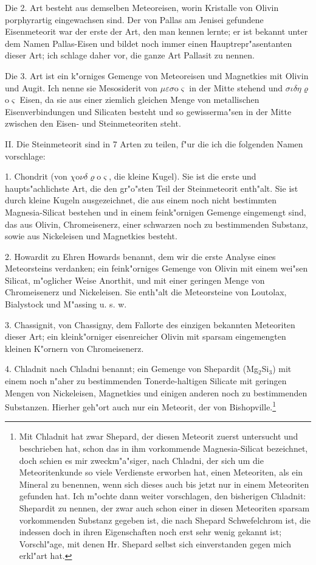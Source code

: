 \documentclass[a4paper, 11pt, oneside, german]{article}
\begin{document}
Die 2. Art besteht aus demselben Meteoreisen, worin Kristalle von Olivin porphyrartig eingewachsen sind. Der von Pallas am Jenisei gefundene Eisenmeteorit war der erste der Art, den man kennen lernte; er ist bekannt unter dem Namen Pallas-Eisen und bildet noch immer einen Hauptrepr"asentanten dieser Art; ich schlage daher vor, die ganze Art Pallasit zu nennen.

Die 3. Art ist ein k"orniges Gemenge von Meteoreisen und Magnetkies mit Olivin und Augit. Ich nenne sie Mesosiderit von $\mu\varepsilon\sigma$o$\varsigma$ in der Mitte stehend und $\sigma\iota\delta\eta\varrho$o$\varsigma$ Eisen, da sie aus einer ziemlich gleichen Menge von metallischen Eisenverbindungen und Silicaten besteht und so gewisserma"sen in der Mitte zwischen den Eisen- und Steinmeteoriten steht.

II. Die Steinmeteorit sind in 7 Arten zu teilen, f"ur die ich die folgenden Namen vorschlage:

1. Chondrit (von $\chi$o$\nu\delta\varrho$o$\varsigma$, die kleine Kugel). Sie ist die erste und haupts"achlichste Art, die den gr"o"sten Teil der Steinmeteorit enth"alt. Sie ist durch kleine Kugeln ausgezeichnet, die aus einem noch nicht bestimmten Magnesia-Silicat bestehen und in einem feink"ornigen Gemenge eingemengt sind, das aus Olivin, Chromeisenerz, einer schwarzen noch zu bestimmenden Substanz, sowie aus Nickeleisen und Magnetkies besteht.

2. Howardit zu Ehren Howards benannt, dem wir die erste Analyse eines Meteorsteins verdanken; ein feink"orniges Gemenge von Olivin mit einem wei"sen Silicat, m"oglicher Weise Anorthit, und mit einer geringen Menge von Chromeisenerz und Nickeleisen. Sie enth"alt die Meteorsteine von Loutolax, Bialystock und M"assing u. s. w.

3. Chassignit, von Chassigny, dem Fallorte des einzigen bekannten Meteoriten dieser Art; ein kleink"orniger eisenreicher Olivin mit sparsam eingemengten kleinen K"ornern von Chromeisenerz.

4. Chladnit nach Chladni benannt; ein Gemenge von Shepardit (Mg$_{2}$Si$_{3}$) mit einem noch n"aher zu bestimmenden Tonerde-haltigen Silicate mit geringen Mengen von Nickeleisen, Magnetkies und einigen anderen noch zu bestimmenden Substanzen. Hierher geh"ort auch nur ein Meteorit, der von Bishopville.\footnote{Mit Chladnit hat zwar Shepard, der diesen Meteorit zuerst untersucht und beschrieben hat, schon das in ihm vorkommende Magnesia-Silicat bezeichnet, doch schien es mir zweckm"a"siger, nach Chladni, der sich um die Meteoritenkunde so viele Verdienste erworben hat, einen Meteoriten, als ein Mineral zu benennen, wenn sich dieses auch bis jetzt nur in einem Meteoriten gefunden hat. Ich m"ochte dann weiter vorschlagen, den bisherigen Chladnit: Shepardit zu nennen, der zwar auch schon einer in diesen Meteoriten sparsam vorkommenden Substanz gegeben ist, die nach Shepard Schwefelchrom ist, die indessen doch in ihren Eigenschaften noch erst sehr wenig gekannt ist; Vorschl"age, mit denen Hr. Shepard selbst sich einverstanden gegen mich erkl"art hat.}
\end{document}

